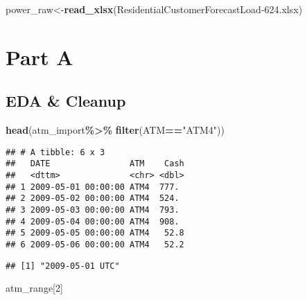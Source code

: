 \documentclass[
]{article}
\newenvironment{Shaded}{\begin{snugshade}}{\end{snugshade}}
\newcommand{\DecValTok}[1]{\textcolor[rgb]{0.00,0.00,0.81}{#1}}
\newcommand{\FunctionTok}[1]{\textcolor[rgb]{0.13,0.29,0.53}{\textbf{#1}}}
\newcommand{\NormalTok}[1]{#1}
\newcommand{\OtherTok}[1]{\textcolor[rgb]{0.56,0.35,0.01}{#1}}
\newcommand{\SpecialCharTok}[1]{\textcolor[rgb]{0.81,0.36,0.00}{\textbf{#1}}}
\newcommand{\StringTok}[1]{\textcolor[rgb]{0.31,0.60,0.02}{#1}}
\begin{document}
\begin{Shaded}
\begin{Highlighting}[]
\NormalTok{power\_raw}\OtherTok{\textless{}{-}}\FunctionTok{read\_xlsx}\NormalTok{(}\StringTok{\textquotesingle{}ResidentialCustomerForecastLoad{-}624.xlsx\textquotesingle{}}\NormalTok{)}
\end{Highlighting}
\end{Shaded}

\hypertarget{part-a-1}{%
\section{Part A}\label{part-a-1}}

\hypertarget{eda-cleanup}{%
\subsection{EDA \& Cleanup}\label{eda-cleanup}}

\begin{Shaded}
\begin{Highlighting}[]
\FunctionTok{head}\NormalTok{(atm\_import}\SpecialCharTok{\%\textgreater{}\%}
       \FunctionTok{filter}\NormalTok{(ATM}\SpecialCharTok{==}\StringTok{"ATM4"}\NormalTok{))}
\end{Highlighting}
\end{Shaded}

\begin{verbatim}
## # A tibble: 6 x 3
##   DATE                ATM    Cash
##   <dttm>              <chr> <dbl>
## 1 2009-05-01 00:00:00 ATM4  777. 
## 2 2009-05-02 00:00:00 ATM4  524. 
## 3 2009-05-03 00:00:00 ATM4  793. 
## 4 2009-05-04 00:00:00 ATM4  908. 
## 5 2009-05-05 00:00:00 ATM4   52.8
## 6 2009-05-06 00:00:00 ATM4   52.2
\end{verbatim}

\begin{Shaded}
\end{Shaded}

\begin{verbatim}
## [1] "2009-05-01 UTC"
\end{verbatim}

\begin{Shaded}
\begin{Highlighting}[]
\NormalTok{atm\_range[}\DecValTok{2}\NormalTok{]}
\end{Highlighting}
\end{Shaded}
\end{document}
